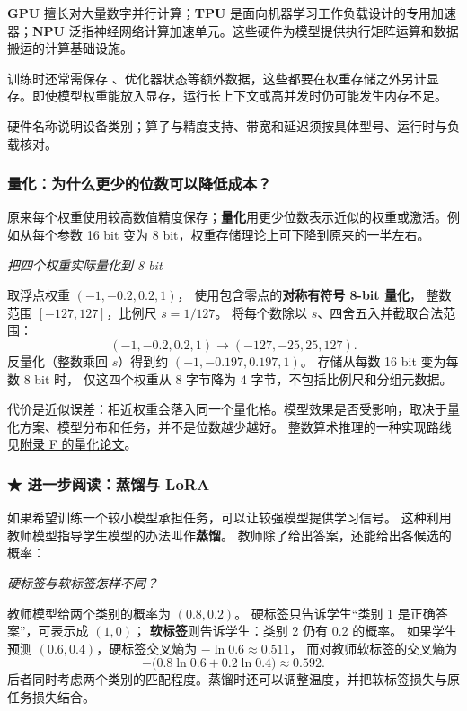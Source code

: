 \textbf{GPU} 擅长对大量数字并行计算；\textbf{TPU} 是面向机器学习工作负载设计的专用加速器；\textbf{NPU} 泛指神经网络计算加速单元。这些硬件为模型提供执行矩阵运算和数据搬运的计算基础设施。

\begin{warningbox}
训练时还常需保存 、优化器状态等额外数据，这些都要在权重存储之外另计显存。即使模型权重能放入显存，运行长上下文或高并发时仍可能发生内存不足。

硬件名称说明设备类别；算子与精度支持、带宽和延迟须按具体型号、运行时与负载核对。
\end{warningbox}


\subsubsection*{量化：为什么更少的位数可以降低成本？}
\label{concept:quant}

原来每个权重使用较高数值精度保存；\textbf{量化}用更少位数表示近似的权重或激活。例如从每个参数 16 bit 变为 8 bit，权重存储理论上可下降到原来的一半左右。

\begin{example}
\noindent\emph{把四个权重实际量化到 8 bit}\par

取浮点权重 $(-1,-0.2,0.2,1)$，
使用包含零点的\textbf{对称有符号 8-bit 量化}，
整数范围 $[-127,127]$，比例尺 $s=1/127$。
将每个数除以 $s$、四舍五入并截取合法范围：
\[
(-1,-0.2,0.2,1)
\longrightarrow(-127,-25,25,127).
\]
反量化（整数乘回 $s$）得到约
$(-1,-0.197,0.197,1)$。
存储从每数 16 bit 变为每数 8 bit 时，
仅这四个权重从 8 字节降为 4 字节，不包括比例尺和分组元数据。
\end{example}

代价是近似误差：相近权重会落入同一个量化格。模型效果是否受影响，取决于量化方案、模型分布和任务，并不是位数越少越好。
整数算术推理的一种实现路线见\hyperref[source:integer-quantization]{附录 F 的量化论文}。

\subsubsection*{\texorpdfstring{{\symboliconfont ★}}{★} 进一步阅读：蒸馏与 LoRA}

如果希望训练一个较小模型承担任务，可以让较强模型提供学习信号。
\label{concept:distillation}%
这种利用教师模型指导学生模型的办法叫作\textbf{蒸馏}。
教师除了给出答案，还能给出各候选的概率：

\begin{example}
\noindent\emph{硬标签与软标签怎样不同？}\par

教师模型给两个类别的概率为 $(0.8,0.2)$。
硬标签只告诉学生“类别 1 是正确答案”，可表示成 $(1,0)$；
\textbf{软标签}则告诉学生：类别 2 仍有 $0.2$ 的概率。
如果学生预测 $(0.6,0.4)$，硬标签交叉熵为
$-\ln0.6\approx0.511$，
而对教师软标签的交叉熵为
\[
-\bigl(0.8\ln0.6+0.2\ln0.4\bigr)\approx0.592.
\]
后者同时考虑两个类别的匹配程度。蒸馏时还可以调整温度，并把软标签损失与原任务损失结合。
\end{example}

